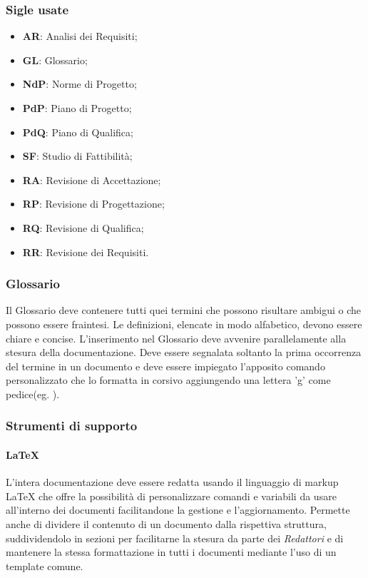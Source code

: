 \subsubsection{Sigle usate}
\begin{itemize}
	\item \textbf{AR}: Analisi dei Requisiti;
	\item \textbf{GL}: Glossario;
	\item \textbf{NdP}: Norme di Progetto;
	\item \textbf{PdP}: Piano di Progetto;
	\item \textbf{PdQ}: Piano di Qualifica;
	\item \textbf{SF}: Studio di Fattibilità;
	\item \textbf{RA}: Revisione di Accettazione;
	\item \textbf{RP}: Revisione di Progettazione;
	\item \textbf{RQ}: Revisione di Qualifica;
	\item \textbf{RR}: Revisione dei Requisiti.
\end{itemize}


\subsubsection{Glossario}
Il Glossario deve contenere tutti quei termini che possono risultare ambigui o che possono essere fraintesi. Le definizioni, elencate in modo alfabetico, devono essere chiare e concise.
L'inserimento nel Glossario deve avvenire parallelamente alla stesura della documentazione.
Deve essere segnalata soltanto la prima occorrenza del termine in un documento e deve essere impiegato l'apposito comando personalizzato che lo formatta in corsivo aggiungendo una lettera 'g' come pedice(eg. ).

\subsubsection{Strumenti di supporto}
\paragraph{\LaTeX} \Spazio
L'intera documentazione deve essere redatta usando il linguaggio di markup \LaTeX \emph{ }che offre la possibilità di personalizzare comandi e variabili da usare all'interno dei documenti facilitandone la gestione e l'aggiornamento. Permette anche di dividere il contenuto di un documento dalla rispettiva struttura, suddividendolo in sezioni per facilitarne la stesura da parte dei \emph{Redattori} e di mantenere la stessa formattazione in tutti i documenti mediante l'uso di un template comune.


